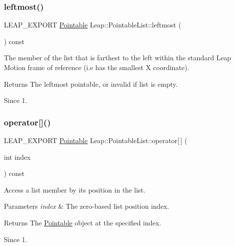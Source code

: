 \subsubsection{\texorpdfstring{leftmost()}{leftmost()}}
{\footnotesize\ttfamily L\+E\+A\+P\+\_\+\+E\+X\+P\+O\+RT \hyperlink{class_leap_1_1_pointable}{Pointable} Leap\+::\+Pointable\+List\+::leftmost (\begin{DoxyParamCaption}{ }\end{DoxyParamCaption}) const}

The member of the list that is farthest to the left within the standard Leap Motion frame of reference (i.\+e has the smallest X coordinate).


\begin{DoxyCodeInclude}
\end{DoxyCodeInclude}


\begin{DoxyReturn}{Returns}
The leftmost pointable, or invalid if list is empty. 
\end{DoxyReturn}
\begin{DoxySince}{Since}
1. 
\end{DoxySince}
\mbox{\label{class_leap_1_1_pointable_list_a9f5818d81e32a028dfb2ea9e593a26c7}} 
\subsubsection{\texorpdfstring{operator[]()}{operator[]()}}
{\footnotesize\ttfamily L\+E\+A\+P\+\_\+\+E\+X\+P\+O\+RT \hyperlink{class_leap_1_1_pointable}{Pointable} Leap\+::\+Pointable\+List\+::operator\mbox{[}$\,$\mbox{]} (\begin{DoxyParamCaption}\item[{int}]{index }\end{DoxyParamCaption}) const}

Access a list member by its position in the list.


\begin{DoxyCodeInclude}
\end{DoxyCodeInclude}



\begin{DoxyParams}{Parameters}
{\em index} & The zero-\/based list position index. \\
\hline
\end{DoxyParams}
\begin{DoxyReturn}{Returns}
The \hyperlink{class_leap_1_1_pointable}{Pointable} object at the specified index. 
\end{DoxyReturn}
\begin{DoxySince}{Since}
1. 
\end{DoxySince}
\mbox{\label{class_leap_1_1_pointable_list_ab16ac6f909711f5390ac267d4962be90}} 
